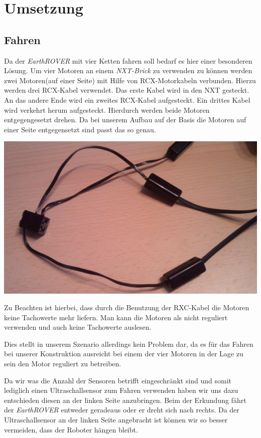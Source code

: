 \chapter{Umsetzung}
\section{Fahren}
Da der \textit{EarthROVER} mit vier Ketten fahren soll bedarf es hier einer besonderen Lösung. Um vier Motoren an einem \textit{NXT-Brick} zu verwenden zu können werden zwei Motoren(auf einer Seite) mit Hilfe von RCX-Motorkabeln verbunden. Hierzu werden drei RCX-Kabel verwendet. Das erste Kabel wird in den NXT gesteckt. An das andere Ende wird ein zweites RCX-Kabel aufgesteckt. Ein drittes Kabel wird verkehrt herum aufgesteckt. Hierdurch werden beide Motoren entgegengesetzt drehen. Da bei unserem Aufbau auf der Basis die Motoren auf einer Seite entgegensetzt sind passt das so genau. 

\begin{capfigure}
	 \includegraphics[width=\textwidth]{images/implementation/rcxcables}
\end{capfigure}

Zu Beachten ist hierbei, dass durch die Benutzung der RXC-Kabel die Motoren keine Tachowerte mehr liefern. Man kann die Motoren als nicht reguliert verwenden und auch keine Tachowerte auslesen.

Dies stellt in unserem Szenario allerdings kein Problem dar, da es für das Fahren bei unserer Konstruktion ausreicht bei einem der vier Motoren in der Lage zu sein den Motor reguliert zu betreiben.

Da wir was die Anzahl der Sensoren betrifft eingeschränkt sind und somit lediglich einen Ultraschallsensor zum Fahren verwenden haben wir uns dazu entschieden diesen an der linken Seite anzubringen. Beim der Erkundung fährt der \textit{EarthROVER} entweder geradeaus oder er dreht sich nach rechts. Da der Ultraschallsensor an der linken Seite angebracht ist können wir so besser vermeiden, dass der Roboter hängen bleibt.

